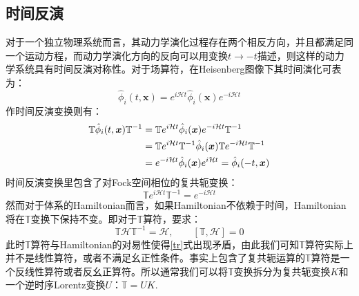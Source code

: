 \subsection*{时间反演}
对于一个独立物理系统而言，其动力学演化过程存在两个相反方向，并且都满足同一个运动方程，而动力学演化方向的反向可以用变换$t\rightarrow-t$描述，则这样的动力学系统具有时间反演对称性。对于场算符，在Heisenberg图像下其时间演化可表为：
\begin{equation}
\hat{\phi}_i(t,\boldsymbol{x})=e^{i\mathcal{H}t}\hat{\phi}_i(\boldsymbol{x})e^{-i\mathcal{H}t}
\end{equation}
作时间反演变换则有：
\begin{align}
\mathbb{T}\hat{\phi}_i(t,\boldsymbol{x})\mathbb{T}^{-1}&=\mathbb{T}e^{i\mathcal{H}t}\hat{\phi}_i(\boldsymbol{x})e^{-i\mathcal{H}t}\mathbb{T}^{-1}\notag\\
&=\mathbb{T}e^{i\mathcal{H}t}\mathbb{T}^{-1}\hat{\phi}_i(\boldsymbol{x})\mathbb{T}e^{-i\mathcal{H}t}\mathbb{T}^{-1}\notag\\
&=e^{-i\mathcal{H}t}\hat{\phi}_i(\boldsymbol{x})e^{i\mathcal{H}t}=\hat{\phi}_i(-t,\boldsymbol{x})
\end{align}
时间反演变换里包含了对Fock空间相位的复共轭变换：
\begin{equation}
\mathbb{T}e^{i\mathcal{H}t}\mathbb{T}^{-1}=e^{-i\mathcal{H}t}
\label{tr}
\end{equation}
然而对于体系的Hamiltonian而言，如果Hamiltonian不依赖于时间，Hamiltonian将在$\mathbb{T}$变换下保持不变。即对于$\mathbb{T}$算符，要求：
\begin{equation}
\mathbb{T}\mathcal{H}\mathbb{T}^{-1}=\mathcal{H},\qquad [\mathbb{T},\mathcal{H}]=0
\end{equation}
此时$\mathbb{T}$算符与Hamiltonian的对易性使得\eqref{tr}式出现矛盾，由此我们可知$\mathbb{T}$算符实际上并不是线性算符，或者不满足幺正性条件。事实上包含了复共轭运算的$\mathbb{T}$算符是一个反线性算符或者反幺正算符。所以通常我们可以将$\mathbb{T}$变换拆分为复共轭变换$K$和一个逆时序Lorentz变换$U$：$\mathbb{T}=UK$.

